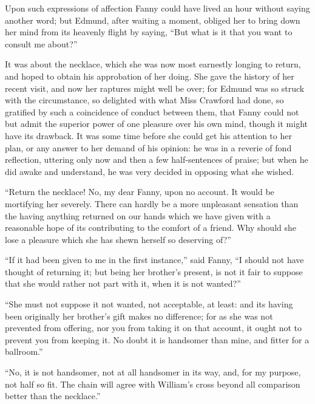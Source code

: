 Upon such expressions of affection Fanny could have
lived an hour without saying another word; but Edmund,
after waiting a moment, obliged her to bring down her
mind from its heavenly flight by saying, ``But what is it
that you want to consult me about?''

It was about the necklace, which she was now most earnestly
longing to return, and hoped to obtain his approbation
of her doing.  She gave the history of her recent visit,
and now her raptures might well be over; for Edmund was so
struck with the circumstance, so delighted with what Miss
Crawford had done, so gratified by such a coincidence
of conduct between them, that Fanny could not but admit
the superior power of one pleasure over his own mind,
though it might have its drawback.  It was some time
before she could get his attention to her plan, or any
answer to her demand of his opinion:  he was in a reverie
of fond reflection, uttering only now and then a few
half-sentences of praise; but when he did awake and understand,
he was very decided in opposing what she wished.

``Return the necklace!  No, my dear Fanny, upon no account.
It would be mortifying her severely.  There can hardly
be a more unpleasant sensation than the having anything
returned on our hands which we have given with a reasonable
hope of its contributing to the comfort of a friend.
Why should she lose a pleasure which she has shewn herself
so deserving of?''

``If it had been given to me in the first instance,''
said Fanny, ``I should not have thought of returning it;
but being her brother's present, is not it fair to suppose
that she would rather not part with it, when it is
not wanted?''

``She must not suppose it not wanted, not acceptable,
at least:  and its having been originally her brother's
gift makes no difference; for as she was not prevented
from offering, nor you from taking it on that account,
it ought not to prevent you from keeping it.  No doubt it
is handsomer than mine, and fitter for a ballroom.''

``No, it is not handsomer, not at all handsomer
in its way, and, for my purpose, not half so fit.
The chain will agree with William's cross beyond
all comparison better than the necklace.''

